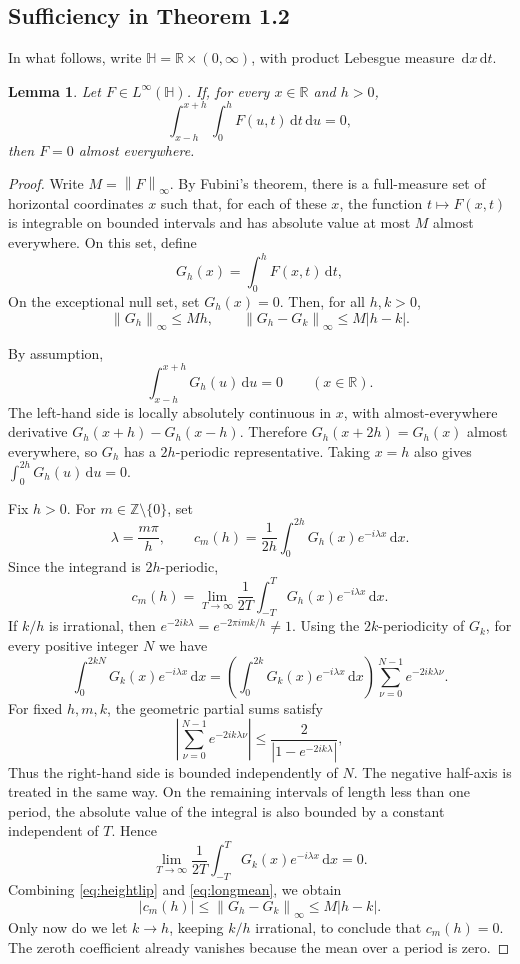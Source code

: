 \documentclass[12pt,a4paper]{article}
\newtheorem{lemma}[theorem]{Lemma}
\theoremstyle{remark}
\newcommand{\dd}{\,\mathrm d}
\newcommand{\norm}[1]{\left\lVert#1\right\rVert}
\newcommand{\abs}[1]{\left\lvert#1\right\rvert}
\begin{document}
\subsection{Sufficiency in Theorem 1.2}
In what follows, write $\mathbb H=\mathbb R\times(0,\infty)$, with product Lebesgue measure
$\dd x\dd t$.

\begin{lemma}\label{lem:boxunique}
Let $F\in L^\infty(\mathbb H)$. If, for every $x\in\mathbb R$ and $h>0$,
\begin{equation}\label{eq:zerobox}
\int_{x-h}^{x+h}\int_0^hF(u,t)\dd t\dd u=0,
\end{equation}
then $F=0$ almost everywhere.
\end{lemma}
\begin{proof}
Write $M=\norm F_\infty$. By Fubini's theorem, there is a full-measure set of horizontal coordinates $x$
such that, for each of these $x$, the function $t\mapsto F(x,t)$ is integrable on bounded intervals and has absolute value at most $M$ almost everywhere.
On this set, define
\[
G_h(x)=\int_0^hF(x,t)\dd t,
\]
On the exceptional null set, set $G_h(x)=0$. Then, for all $h,k>0$,
\begin{equation}\label{eq:heightlip}
\norm{G_h}_\infty\le Mh,
\qquad \norm{G_h-G_k}_\infty\le M|h-k|.
\end{equation}

By assumption,
\[
\int_{x-h}^{x+h}G_h(u)\dd u=0\qquad(x\in\mathbb R).
\]
The left-hand side is locally absolutely continuous in $x$, with almost-everywhere derivative
$G_h(x+h)-G_h(x-h)$. Therefore
$G_h(x+2h)=G_h(x)$ almost everywhere, so $G_h$ has a $2h$-periodic representative.
Taking $x=h$ also gives $\int_0^{2h}G_h(u)\dd u=0$.

Fix $h>0$. For $m\in\mathbb Z\setminus\{0\}$, set
\[
\lambda=\frac{m\pi}{h},\qquad
c_m(h)=\frac1{2h}\int_0^{2h}G_h(x)e^{-i\lambda x}\dd x.
\]
Since the integrand is $2h$-periodic,
\begin{equation}\label{eq:longmean}
c_m(h)=\lim_{T\to\infty}\frac1{2T}\int_{-T}^T G_h(x)e^{-i\lambda x}\dd x.
\end{equation}
If $k/h$ is irrational, then $e^{-2ik\lambda}=e^{-2\pi i mk/h}\ne1$.
Using the $2k$-periodicity of $G_k$, for every positive integer $N$ we have
\[
\int_0^{2kN}G_k(x)e^{-i\lambda x}\dd x
=\left(\int_0^{2k}G_k(x)e^{-i\lambda x}\dd x\right)
 \sum_{\nu=0}^{N-1}e^{-2ik\lambda\nu}.
\]
For fixed $h,m,k$, the geometric partial sums satisfy
\[
\abs{\sum_{\nu=0}^{N-1}e^{-2ik\lambda\nu}}
\le\frac{2}{|1-e^{-2ik\lambda}|},
\]
Thus the right-hand side is bounded independently of $N$. 
The negative half-axis is treated in the same way. On the remaining intervals of length less than one period,
the absolute value of the integral is also bounded by a constant independent of $T$. Hence
\[
\lim_{T\to\infty}\frac1{2T}\int_{-T}^T G_k(x)e^{-i\lambda x}\dd x=0.
\]
Combining \eqref{eq:heightlip} and \eqref{eq:longmean}, we obtain
\[
|c_m(h)|\le\norm{G_h-G_k}_\infty\le M|h-k|.
\]
Only now do we let $k\to h$, keeping $k/h$ irrational, to conclude that $c_m(h)=0$.
The zeroth coefficient already vanishes because the mean over a period is zero.


\end{proof}
\end{document}

